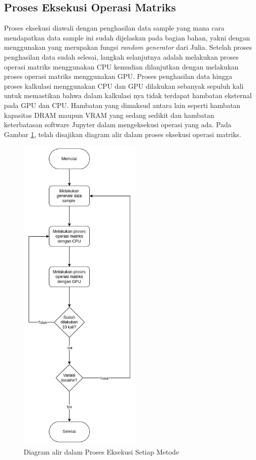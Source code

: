 \subsection{Proses Eksekusi Operasi Matriks}

Proses eksekusi diawali dengan penghasilan data sample yang mana cara
mendapatkan data sample ini sudah dijelaskan pada bagian bahan, yakni dengan
menggunakan  yang merupakan fungsi \emph{random generator} dari
Julia. Setelah proses penghasilan data sudah selesai, langkah selanjutnya
adalah melakukan proses operasi matriks menggunakan CPU kemudian dilanjutkan
dengan melakukan proses operasi matriks menggunakan GPU. Proses penghasilan
data hingga proses kalkulasi menggunakan CPU dan GPU dilakukan sebanyak sepuluh
kali untuk memastikan bahwa dalam kalkulasi nya tidak terdapat hambatan
eksternal pada GPU dan CPU. Hambatan yang dimaksud antara lain seperti hambatan
kapasitas DRAM maupun VRAM yang sedang sedikit dan hambatan keterbatasan
software Jupyter dalam mengeksekusi operasi yang ada. Pada Gambar
\ref{img:methods_execution}, telah disajikan diagram alir dalam proses eksekusi
operasi matriks.

\begin{figure}[H]
  \centering
  \includegraphics[width=6cm, scale=1]{schema/langkah-2.drawio.png}
  \caption{Diagram alir dalam Proses Eksekusi Setiap Metode}
  \label{img:methods_execution}
\end{figure}

